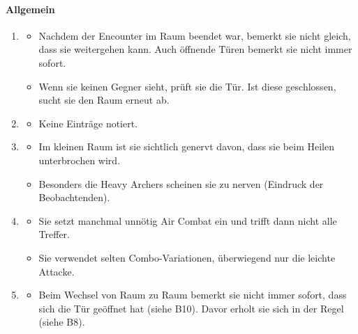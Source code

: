 \documentclass[../Main.tex]{subfiles}
\begin{document}
\paragraph{Allgemein}
\begin{enumerate}[label=\textbf{B\arabic*}, leftmargin=1.5cm, itemsep=0.8em, resume]
\item
    \begin{itemize}[nosep]
        \item Nachdem der Encounter im Raum beendet war, bemerkt sie nicht gleich, dass sie weitergehen kann. Auch öffnende Türen bemerkt sie nicht immer sofort.
        \item Wenn sie keinen Gegner sieht, prüft sie die Tür. Ist diese geschlossen, sucht sie den Raum erneut ab.
    \end{itemize}

\item
    \begin{itemize}[nosep]
        \item Keine Einträge notiert.
    \end{itemize}

\item
    \begin{itemize}[nosep]
        \item Im kleinen Raum ist sie sichtlich genervt davon, dass sie beim Heilen unterbrochen wird.
        \item Besonders die Heavy Archers scheinen sie zu nerven (Eindruck der Beobachtenden).
    \end{itemize}

\item
    \begin{itemize}[nosep]
        \item Sie setzt manchmal unnötig Air Combat ein und trifft dann nicht alle Treffer.
        \item Sie verwendet selten Combo-Variationen, überwiegend nur die leichte Attacke.
    \end{itemize}

\item
    \begin{itemize}[nosep]
        \item Beim Wechsel von Raum zu Raum bemerkt sie nicht immer sofort, dass sich die Tür geöffnet hat (siehe B10). Davor erholt sie sich in der Regel (siehe B8).
    \end{itemize}
\end{enumerate}
\end{document}
